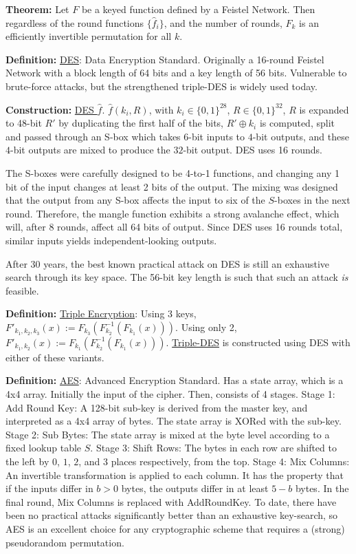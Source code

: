 \documentclass[10pt]{article}
\newcommand{\defn}[1]{{\bf Definition:} \underline{#1}}
\newcommand{\thm}[1]{{\bf Theorem:} \underline{#1}}
\newcommand{\con}[1]{{\bf Construction:} \underline{#1}}
\newcommand{\xor}{\oplus}
\begin{document}
\begin{multicols}{3}
\thm{}Let $F$ be a keyed function defined by a Feistel Network. Then regardless of the round functions $\{\hat{f}_i\}$, and the number of rounds, $F_k$ is an efficiently invertible permutation for all $k$.

\defn{DES}: Data Encryption Standard. Originally a 16-round Feistel Network with a block length of 64 bits and a key length of 56 bits. Vulnerable to brute-force attacks, but the strengthened triple-DES is widely used today.

\con{DES $\hat{f}$}. $\hat{f}(k_i,R)$, with $k_i\in\{0,1\}^{28}$, $R\in\{0,1\}^{32}$, $R$ is expanded to 48-bit $R'$ by duplicating the first half of the bits, $R'\xor k_i$ is computed, split and passed through an S-box which takes $6$-bit inputs to $4$-bit outputs, and these $4$-bit outputs are mixed to produce the $32$-bit output. DES uses 16 rounds.

The S-boxes were carefully designed to be 4-to-1 functions, and changing any 1 bit of the input changes at least 2 bits of the output. The mixing was designed that the output from any S-box affects the input to six of the $S$-boxes in the next round. Therefore, the mangle function exhibits a strong avalanche effect, which will, after 8 rounds, affect all 64 bits of output. Since DES uses 16 rounds total, similar inputs yields independent-looking outputs.

After 30 years, the best known practical attack on DES is still an exhaustive search through its key space. The 56-bit key length is such that such an attack {\it is} feasible.

\defn{Triple Encryption}: Using 3 keys, $F'_{k_1,k_2,k_3}(x):=F_{k_3}(F_{k_2}^{-1}(F_{k_1}(x)))$. Using only 2, $F'_{k_1,k_2}(x):=F_{k_1}(F_{k_2}^{-1}(F_{k_1}(x)))$. \underline{Triple-DES} is constructed using DES with either of these variants.

\defn{AES}: Advanced Encryption Standard. Has a state array, which is a 4x4 array. Initially the input of the cipher. Then, consists of 4 stages. Stage 1: Add Round Key: A 128-bit sub-key is derived from the master key, and interpreted as a 4x4 array of bytes. The state array is XORed with the sub-key. Stage 2: Sub Bytes: The state array is mixed at the byte level according to a fixed lookup table $S$. Stage 3: Shift Rows: The bytes in each row are shifted to the left by $0$, $1$, $2$, and $3$ places respectively, from the top. Stage 4: Mix Columns: An invertible transformation is applied to each column. It has the property that if the inputs differ in $b>0$ bytes, the outputs differ in at least $5-b$ bytes. In the final round, Mix Columns is replaced with AddRoundKey. To date, there have been no practical attacks significantly better than an exhaustive key-search, so AES is an excellent choice for any cryptographic scheme that requires a (strong) pseudorandom permutation.


\end{multicols}
\end{document}
